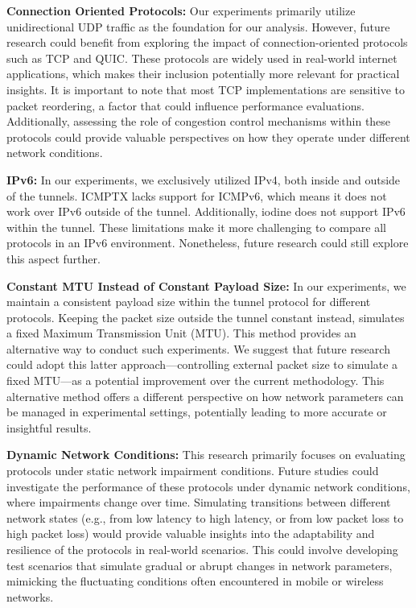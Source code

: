 \noindent\textbf{Connection Oriented Protocols:}
Our experiments primarily utilize unidirectional UDP traffic as the foundation for our analysis.
However, future research could benefit from exploring the impact of connection-oriented protocols such as TCP and QUIC.
These protocols are widely used in real-world internet applications, which makes their inclusion potentially more relevant for practical insights.
It is important to note that most TCP implementations are sensitive to packet reordering, a factor that could influence performance evaluations.
Additionally, assessing the role of congestion control mechanisms within these protocols could provide valuable perspectives on how they operate under different network conditions.

\noindent\textbf{IPv6:}
In our experiments, we exclusively utilized IPv4, both inside and outside of the tunnels.
ICMPTX lacks support for ICMPv6, which means it does not work over IPv6 outside of the tunnel.
Additionally, iodine does not support IPv6 within the tunnel.
These limitations make it more challenging to compare all protocols in an IPv6 environment.
Nonetheless, future research could still explore this aspect further.

\noindent\textbf{Constant MTU Instead of Constant Payload Size:}
In our experiments, we maintain a consistent payload size within the tunnel protocol for different protocols.
Keeping the packet size outside the tunnel constant instead, simulates a fixed Maximum Transmission Unit (MTU).
This method provides an alternative way to conduct such experiments.
We suggest that future research could adopt this latter approach—controlling external packet size to simulate a fixed MTU—as a potential improvement over the current methodology.
This alternative method offers a different perspective on how network parameters can be managed in experimental settings, potentially leading to more accurate or insightful results.

\noindent\textbf{Dynamic Network Conditions:}
This research primarily focuses on evaluating protocols under static network impairment conditions.
Future studies could investigate the performance of these protocols under dynamic network conditions, where impairments change over time.
Simulating transitions between different network states (e.g., from low latency to high latency, or from low packet loss to high packet loss) would provide valuable insights into the adaptability and resilience of the protocols in real-world scenarios.
This could involve developing test scenarios that simulate gradual or abrupt changes in network parameters, mimicking the fluctuating conditions often encountered in mobile or wireless networks.

